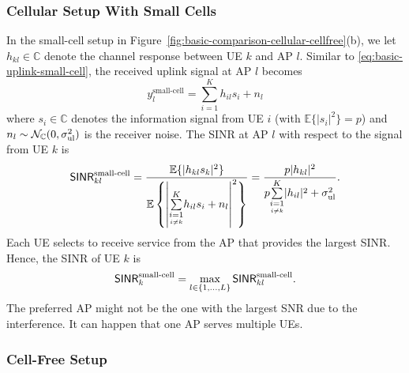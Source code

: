 \subsubsection{Cellular Setup With Small Cells}

In the small-cell setup in Figure~\ref{fig:basic-comparison-cellular-cellfree}(b), we let $h_{kl} \in \mathbb{C}$ denote the channel response between \gls{UE} $k$ and AP $l$. Similar to \eqref{eq:basic-uplink-small-cell}, the received uplink signal at AP $l$ becomes 
\begin{equation} \label{eq:basic-uplink-small-cell-multiuser}
y_l^{\textrm{small-cell}} = \sum_{i=1}^{K} h_{il} s_i + n_l
\end{equation}
where $s_i \in \mathbb{C}$ denotes the information signal from \gls{UE} $i$ (with $\mathbb{E}\{ | s_i|^2 \} = p$) and $n_l \sim \mathcal{N}_{\mathbb{C}} ( 0, \sigma^2_{\mathrm{ul}} )$ is the receiver noise.
The \gls{SINR} at \gls{AP} $l$ with respect to the signal from \gls{UE} $k$ is
\begin{equation}
\mathacr{SINR}_{kl}^{\textrm{small-cell}} =  
\frac{\mathbb{E}\{ | h_{kl} s_k  |^2 \}}{ \mathbb{E} \left\{ \left|
\condSum{i=1}{i \neq k}{K}  h_{il} s_i + n_l
\right|^2 \right\} }  = \frac{p |h_{kl}|^2}{p\condSum{i=1}{i \neq k}{K} | h_{il}|^2 +\sigmaUL}. \vspace{-1mm}
\end{equation}
Each \gls{UE} selects to receive service from the AP  that provides the largest \gls{SINR}. Hence, the \gls{SINR} of \gls{UE} $k$ is
\begin{align}  \label{eq:basic-small-cell-SINR-multiuser}
\mathsf{SINR}_k^{\textrm{small-cell}} = \max_{l \in \{1,\ldots,L\} }
\mathsf{SINR}_{kl}^{\textrm{small-cell}}.
\end{align}
The preferred \gls{AP} might not be the one with the largest \gls{SNR} due to the interference. It can happen that one \gls{AP} serves multiple \glspl{UE}.

\vspace{-3mm}
\enlargethispage{\baselineskip} 
\subsubsection{Cell-Free Setup}

